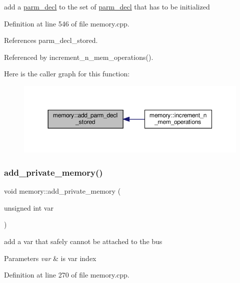 add a \hyperlink{structparm__decl}{parm\+\_\+decl} to the set of \hyperlink{structparm__decl}{parm\+\_\+decl} that has to be initialized 



Definition at line 546 of file memory.\+cpp.



References parm\+\_\+decl\+\_\+stored.



Referenced by increment\+\_\+n\+\_\+mem\+\_\+operations().

Here is the caller graph for this function\+:
\nopagebreak
\begin{figure}[H]
\begin{center}
\leavevmode
\includegraphics[width=350pt]{d8/d99/classmemory_a480a93ec1ca630ee87d15b1ad127f3f2_icgraph}
\end{center}
\end{figure}
\mbox{\label{classmemory_a15d9eb23dfbab98d05a5075f1230c3e0}} 
\subsubsection{\texorpdfstring{add\+\_\+private\+\_\+memory()}{add\_private\_memory()}}
{\footnotesize\ttfamily void memory\+::add\+\_\+private\+\_\+memory (\begin{DoxyParamCaption}\item[{unsigned int}]{var }\end{DoxyParamCaption})}



add a var that safely cannot be attached to the bus 


\begin{DoxyParams}{Parameters}
{\em var} & is var index \\
\hline
\end{DoxyParams}


Definition at line 270 of file memory.\+cpp.




